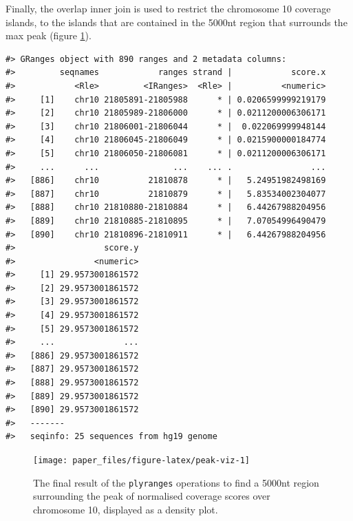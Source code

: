 \documentclass[]{article}
\newenvironment{Shaded}{\begin{snugshade}}{\end{snugshade}}
\newcommand{\KeywordTok}[1]{\textcolor[rgb]{0.13,0.29,0.53}{\textbf{#1}}}
\newcommand{\NormalTok}[1]{#1}
\newcommand{\OperatorTok}[1]{\textcolor[rgb]{0.81,0.36,0.00}{\textbf{#1}}}
\newcommand{\StringTok}[1]{\textcolor[rgb]{0.31,0.60,0.02}{#1}}
\begin{document}
Finally, the overlap inner join is used to restrict the chromosome 10
coverage islands, to the islands that are contained in the 5000nt region
that surrounds the max peak (figure \ref{fig:peak-viz}).

\begin{Shaded}
\end{Shaded}

\begin{verbatim}
#> GRanges object with 890 ranges and 2 metadata columns:
#>         seqnames            ranges strand |            score.x
#>            <Rle>         <IRanges>  <Rle> |          <numeric>
#>     [1]    chr10 21805891-21805988      * | 0.0206599999219179
#>     [2]    chr10 21805989-21806000      * | 0.0211200006306171
#>     [3]    chr10 21806001-21806044      * |  0.022069999948144
#>     [4]    chr10 21806045-21806049      * | 0.0215900000184774
#>     [5]    chr10 21806050-21806081      * | 0.0211200006306171
#>     ...      ...               ...    ... .                ...
#>   [886]    chr10          21810878      * |   5.24951982498169
#>   [887]    chr10          21810879      * |   5.83534002304077
#>   [888]    chr10 21810880-21810884      * |   6.44267988204956
#>   [889]    chr10 21810885-21810895      * |   7.07054996490479
#>   [890]    chr10 21810896-21810911      * |   6.44267988204956
#>                  score.y
#>                <numeric>
#>     [1] 29.9573001861572
#>     [2] 29.9573001861572
#>     [3] 29.9573001861572
#>     [4] 29.9573001861572
#>     [5] 29.9573001861572
#>     ...              ...
#>   [886] 29.9573001861572
#>   [887] 29.9573001861572
#>   [888] 29.9573001861572
#>   [889] 29.9573001861572
#>   [890] 29.9573001861572
#>   -------
#>   seqinfo: 25 sequences from hg19 genome
\end{verbatim}

\begin{figure}

{\centering \texttt{[image: paper\_files/figure-latex/peak-viz-1]} 

}

\caption{The final result of the \texttt{plyranges} operations to find a 5000nt region surrounding the peak of normalised coverage scores over chromosome 10, displayed as a density plot.}\label{fig:peak-viz}
\end{figure}
\end{document}
